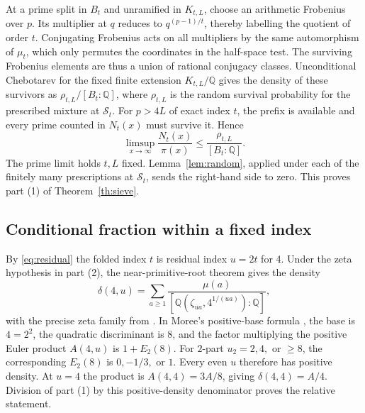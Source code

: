 \documentclass[11pt,reqno]{amsart}
\newcommand{\Q}{\mathbb Q}
\begin{document}
At a prime split in \(B_t\) and unramified in \(K_{t,L}\), choose an arithmetic Frobenius over \(p\). Its multiplier at \(q\) reduces to \(q^{(p-1)/t}\), thereby labelling the quotient of order \(t\). Conjugating Frobenius acts on all multipliers by the same automorphism of \(\mu_t\), which only permutes the coordinates in the half-space test. The surviving Frobenius elements are thus a union of rational conjugacy classes. Unconditional Chebotarev for the fixed finite extension \(K_{t,L}/\Q\) \cite[Theorems~1.3--1.4]{LO} gives the density of these survivors as \(\rho_{t,L}/[B_t:\Q]\), where \(\rho_{t,L}\) is the random survival probability for the prescribed mixture at \(\mathcal S_t\). For \(p>4L\) of exact index \(t\), the prefix is available and every prime counted in \(N_t(x)\) must survive it. Hence
\[
 \limsup_{x\to\infty}\frac{N_t(x)}{\pi(x)}
 \le \frac{\rho_{t,L}}{[B_t:\Q]}.
\]
The prime limit holds \(t,L\) fixed. Lemma~\ref{lem:random}, applied under each of the finitely many prescriptions at \(\mathcal S_t\), sends the right-hand side to zero. This proves part (1) of Theorem~\ref{th:sieve}.

\subsection*{Conditional fraction within a fixed index}
By \eqref{eq:residual} the folded index \(t\) is residual index \(u=2t\) for 4. Under the zeta hypothesis in part (2), the near-primitive-root theorem gives the density
\begin{equation}\label{eq:delta}
 \delta(4,u)=\sum_{a\ge1}\frac{\mu(a)}{[\Q(\zeta_{ua},4^{1/(ua)}):\Q]},
\end{equation}
with the precise zeta family from \cite[Theorem~3.1 at progression modulus \(1\)]{HKMS}. In Moree's positive-base formula \cite[Theorems~2--3 and (4)--(5)]{Moree}, the base is \(4=2^2\), the quadratic discriminant is 8, and the factor multiplying the positive Euler product \(A(4,u)\) is \(1+E_2(8)\). For \(2\)-part \(u_2=2,4,\) or \(\ge8\), the corresponding \(E_2(8)\) is \(0,-1/3,\) or \(1\). Every even \(u\) therefore has positive density. At \(u=4\) the product is \(A(4,4)=3A/8\), giving \(\delta(4,4)=A/4\). Division of part (1) by this positive-density denominator proves the relative statement.
\end{document}
